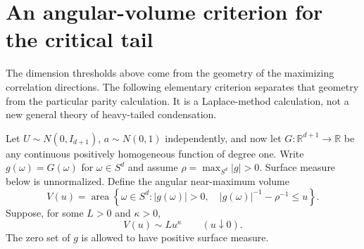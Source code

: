 \section{An angular-volume criterion for the critical tail}
The dimension thresholds above come from the geometry of the maximizing
correlation directions. The following elementary criterion separates that
geometry from the particular parity calculation. It is a Laplace-method
calculation, not a new general theory of heavy-tailed condensation.

Let $U\sim N(0,I_{d+1})$, $a\sim N(0,1)$ independently, and now let
$G:\mathbb R^{d+1}\to\mathbb R$ be any continuous positively
homogeneous function of degree one. Write
$g(\omega)=G(\omega)$ for $\omega\in S^d$ and assume
$\rho=\max_{S^d}|g|>0$. Surface measure below is unnormalized.
Define the angular near-maximum volume
\[
 V(u)=\operatorname{area}\left\{\omega\in S^d:
        |g(\omega)|>0,\quad |g(\omega)|^{-1}-\rho^{-1}\le u\right\}.
\]
Suppose, for some $L>0$ and $\kappa>0$,
\[
                         V(u)\sim L u^\kappa\qquad(u\downarrow0).
 \tag{25}
\]
The zero set of $g$ is allowed to have positive surface measure.

